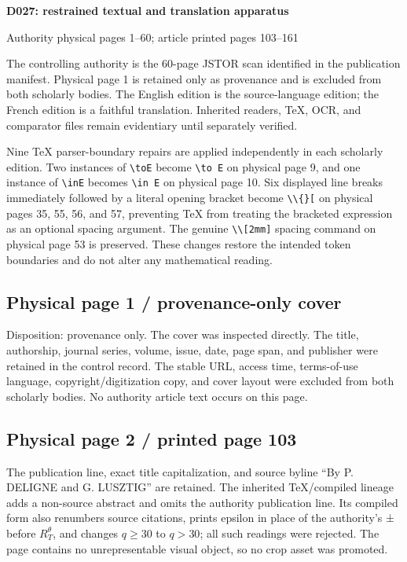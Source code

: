 \documentclass[10pt]{article}
\begin{document}
\begin{center}
{\Large\bfseries D027: restrained textual and translation apparatus}\par
\smallskip
Authority physical pages 1--60; article printed pages 103--161
\end{center}
The controlling authority is the 60-page JSTOR scan identified in the publication manifest. Physical page 1 is retained only as provenance and is excluded from both scholarly bodies. The English edition is the source-language edition; the French edition is a faithful translation. Inherited readers, TeX, OCR, and comparator files remain evidentiary until separately verified.

Nine TeX parser-boundary repairs are applied independently in each scholarly edition. Two instances of \verb|\toE| become \verb|\to E| on physical page 9, and one instance of \verb|\inE| becomes \verb|\in E| on physical page 10. Six displayed line breaks immediately followed by a literal opening bracket become \verb|\\{}[| on physical pages 35, 55, 56, and 57, preventing TeX from treating the bracketed expression as an optional spacing argument. The genuine \verb|\\[2mm]| spacing command on physical page 53 is preserved. These changes restore the intended token boundaries and do not alter any mathematical reading.


\subsection*{Physical page 1 / provenance-only cover}

Disposition: provenance only. The cover was inspected directly. The title, authorship, journal series, volume, issue, date, page span, and publisher were retained in the control record. The stable URL, access time, terms-of-use language, copyright/digitization copy, and cover layout were excluded from both scholarly bodies. No authority article text occurs on this page.\par

\subsection*{Physical page 2 / printed page 103}

The publication line, exact title capitalization, and source byline “By P. DELIGNE and G. LUSZTIG” are retained. The inherited TeX/compiled lineage adds a non-source abstract and omits the authority publication line. Its compiled form also renumbers source citations, prints epsilon in place of the authority's ± before \(R_T^\theta\), and changes \(q\geq30\) to \(q>30\); all such readings were rejected. The page contains no unrepresentable visual object, so no crop asset was promoted.\par
\end{document}
